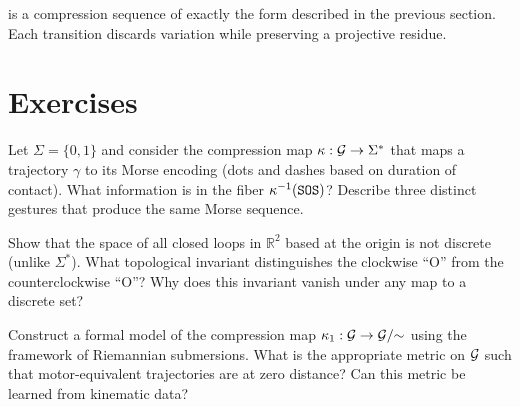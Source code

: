 is a compression sequence of exactly the form described in the previous
section. Each transition discards variation while preserving a projective
residue.

\section*{Exercises}

\begin{exercise}
  Let $\Sigma = \{0, 1\}$ and consider the compression map
  $\kappa : \mathcal{G} \to \Sigma^*$ that maps a trajectory $\gamma$ to
  its Morse encoding (dots and dashes based on duration of contact). What
  information is in the fiber $\kappa^{-1}(\texttt{SOS})$? Describe
  three distinct gestures that produce the same Morse sequence.
\end{exercise}

\begin{exercise}[title={Topological}]
  Show that the space of all closed loops in $\mathbb{R}^2$ based at
  the origin is not discrete (unlike $\Sigma^*$). What topological invariant
  distinguishes the clockwise ``O'' from the counterclockwise ``O''?
  Why does this invariant vanish under any map to a discrete set?
\end{exercise}

\begin{exercise}[title={Open problem}]
  Construct a formal model of the compression map $\kappa_1 : \mathcal{G} \to
  \mathcal{G}/{\sim}$ using the framework of Riemannian submersions. What
  is the appropriate metric on $\mathcal{G}$ such that motor-equivalent
  trajectories are at zero distance? Can this metric be learned from
  kinematic data?
\end{exercise}
